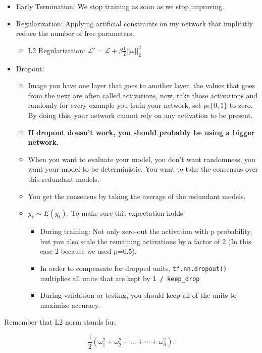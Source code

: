 \documentclass[11pt, a4paper]{article}
\begin{document}
\begin{itemize}
	\item Early Termination: We stop training as soon as we stop improving.
	\item Regularization: Applying artificial constraints on my network that implicitly reduce the number of free parameters.
		\begin{itemize}
			\item L2 Regularization: $ \mathcal{L}' = \mathcal{L} + \beta \frac{1}{2} ||\omega||^2_{2}$
		\end{itemize}
	\item Dropout: 
		\begin{itemize}
			\item Image you have one layer that goes to another layer, the values that goes from the next are often called activations, now, take those activations and randomly for every example you train your network, set $p \epsilon \{0, 1\}$ to zero. By doing this,  your network cannot rely on any activation to be present. 
			\item \textbf{If dropout doesn't work, you should probably be using a bigger network.}
			\item  When you want to evaluate your model, you don't want randomness, you want your model to be deterministic. You want to take the consensus over this redundant models. 
			\item You get the consensus by taking the average of the redundant models. 
			\item $y_e \sim E(y_t)$. To make sure this expectation holds:
				\begin{itemize}
					\item During training: Not only zero-out the activation with p probability, but you also scale the remaining activations by a factor of 2 (In this case 2 because we used p=0.5).
				\item In order to compensate for dropped units, \texttt{tf.nn.dropout()} multiplies all units that are kept by \texttt{1 / keep\_drop}  
				\item During validation or testing, you should keep all of the units to maximize accuracy.
			    \end{itemize}
		\end{itemize}

\end{itemize}



Remember that L2 norm stands for:

\[
	\frac{1}{2} (\omega^2_1 + \omega^2_2 + ... + \cdots + \omega^2_{n})
.\] 
\end{document}
